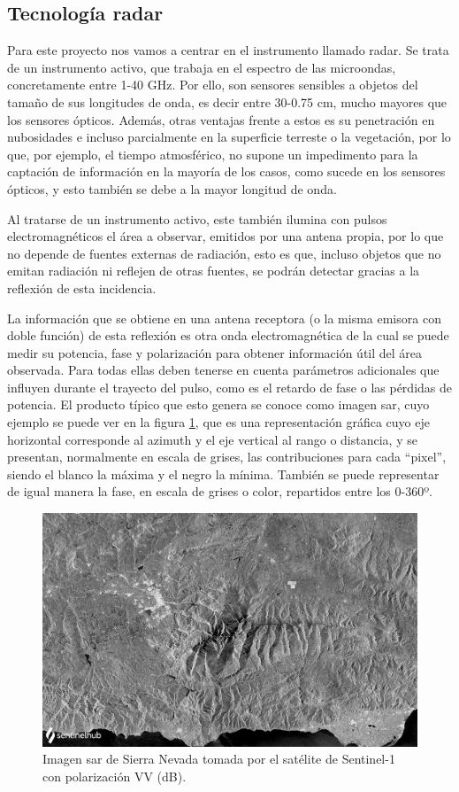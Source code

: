 \subsection{Tecnología radar}
\par Para este proyecto nos vamos a centrar en el instrumento llamado radar. Se trata de un instrumento activo, que trabaja en el espectro de las microondas, concretamente entre 1-40 GHz. Por ello, son sensores sensibles a objetos del tamaño de sus longitudes de onda, es decir entre 30-0.75 cm, mucho mayores que los sensores ópticos. Además, otras ventajas frente a estos es su penetración en nubosidades e incluso parcialmente en la superficie terreste o la vegetación, por lo que, por ejemplo, el tiempo atmosférico, no supone un impedimento para la captación de información en la mayoría de los casos, como sucede en los sensores ópticos, y esto también se debe a la mayor longitud de onda.
\\
\par Al tratarse de un instrumento activo, este también ilumina con pulsos electromagnéticos el área a observar, emitidos por una antena propia, por lo que no depende de fuentes externas de radiación, esto es que, incluso objetos que no emitan radiación ni reflejen de otras fuentes, se podrán detectar gracias a la reflexión de esta incidencia. 
\\ 
\par La información que se obtiene en una antena receptora (o la misma emisora con doble función) de esta reflexión es otra onda electromagnética de la cual se puede medir su potencia, fase y polarización para obtener información útil del área observada. Para todas ellas deben tenerse en cuenta parámetros adicionales que influyen durante el trayecto del pulso, como es el retardo de fase o las pérdidas de potencia. El producto típico que esto genera se conoce como imagen \gls{sar}, cuyo ejemplo se puede ver en la figura \ref{fig:sar}, que es una representación gráfica cuyo eje horizontal corresponde al azimuth y el eje vertical al rango o distancia, y se presentan, normalmente en escala de grises, las contribuciones para cada ``pixel'', siendo el blanco la máxima y el negro la mínima. También se puede representar de igual manera la fase, en escala de grises o color, repartidos entre los 0-360º. 
\\
\begin{figure}[h]
\centering
\captionsetup{width=.8\linewidth}
    \includegraphics[width=.8\linewidth]{archivos/SAR_SN}
    \caption{Imagen \gls{sar} de Sierra Nevada tomada por el satélite de Sentinel-1 con polarización VV (dB). \cite{sentinelhub}}
    \label{fig:sar}
\end{figure}
